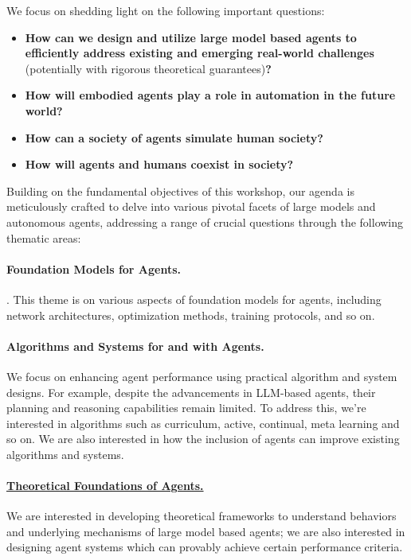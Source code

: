 \documentclass[10pt]{article} %
\begin{document}
We focus on shedding light on the following important questions:
\begin{itemize}
    \item {\bf How can we design and utilize large model based agents to efficiently address existing and emerging real-world challenges} (potentially with rigorous theoretical guarantees){\bf ?}
    \item {\bf How will embodied agents play a role in automation in the future world?} 
    \item {\bf How can a society of agents simulate human society?}
    \item {\bf How will agents and humans coexist in society?}
\end{itemize}

Building on the fundamental objectives of this workshop, our agenda is meticulously crafted to delve into various pivotal facets of large models and autonomous agents, addressing a range of crucial questions through the following thematic areas:


\paragraph{Foundation Models for Agents.}. This theme is on various aspects of foundation models for agents, including network architectures, optimization methods, training protocols, and so on.

\paragraph{Algorithms and Systems for and with Agents.} We focus on enhancing agent performance using practical algorithm and system designs. For example, despite the advancements in LLM-based agents, their planning and reasoning capabilities remain limited. To address this, we're interested in algorithms such as curriculum, active, continual, meta learning and so on. We are also interested in how the inclusion of agents can improve existing algorithms and systems.

\paragraph{\underline{Theoretical Foundations of Agents.}} We are interested in developing theoretical frameworks to understand behaviors and underlying mechanisms of large model based agents; we are also interested in designing agent systems which can provably achieve certain performance criteria.
\end{document}
